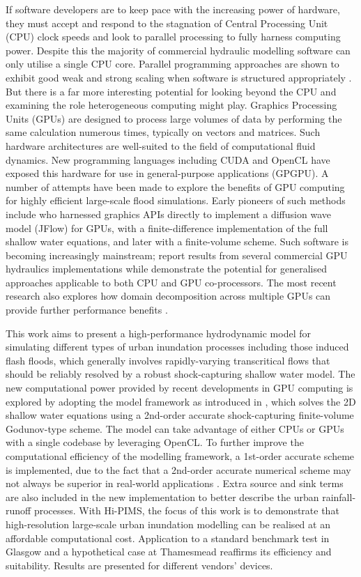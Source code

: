 \documentclass[11pt,english,a4paper]{article}
\begin{document}
If software developers are to keep pace with the increasing power of hardware, they must accept and respond to the stagnation of Central Processing Unit (CPU) clock speeds and look to parallel processing to fully harness computing power. Despite this the majority of commercial hydraulic modelling software can only utilise a single CPU core. Parallel programming approaches are shown to exhibit good weak and strong scaling when software is structured appropriately \citep[e.g.][]{Neal2010,Saetra2012}. But there is a far more interesting potential for looking beyond the CPU and examining the role heterogeneous computing might play. Graphics Processing Units (GPUs) are designed to process large volumes of data by performing the same calculation numerous times, typically on vectors and matrices. Such hardware architectures are well-suited to the field of computational fluid dynamics. New programming languages including CUDA and OpenCL have exposed this hardware for use in general-purpose applications (GPGPU). A number of attempts have been made to explore the benefits of GPU computing for highly efficient large-scale flood simulations. Early pioneers of such methods include \citet{Crossley2009} who harnessed graphics APIs directly to implement a diffusion wave model (JFlow) for GPUs, \citet{Kalyanapu2011} with a finite-difference implementation of the full shallow water equations, and later \citet{Brodtkorb2012} with a finite-volume scheme. Such software is becoming increasingly mainstream; \citet{Pender2013} report results from several commercial GPU hydraulics implementations while \citet{Smith2013} demonstrate the potential for generalised approaches applicable to both CPU and GPU co-processors. The most recent research also explores how domain decomposition across multiple GPUs can provide further performance benefits \citep{Saetra2012}. 

This work aims to present a high-performance hydrodynamic model for simulating different types of urban inundation processes including those induced flash floods, which generally involves rapidly-varying transcritical flows that should be reliably resolved by a robust shock-capturing shallow water model. The new computational power provided by recent developments in GPU computing is explored by adopting the model framework as introduced in \citet{Smith2013}, which solves the 2D shallow water equations using a 2nd-order accurate shock-capturing finite-volume Godunov-type scheme. The model can take advantage of either CPUs or GPUs with a single codebase by leveraging OpenCL. To further improve the computational efficiency of the modelling framework, a 1st-order accurate scheme is implemented, due to the fact that a 2nd-order accurate numerical scheme may not always be superior in real-world applications \citep{Zhang2013}. Extra source and sink terms are also included in the new implementation to better describe the urban rainfall-runoff processes. With Hi-PIMS, the focus of this work is to demonstrate that high-resolution large-scale urban inundation modelling can be realised at an affordable computational cost. Application to a standard benchmark test in Glasgow and a hypothetical case at Thamesmead reaffirms its efficiency and suitability. Results are presented for different vendors' devices.
\end{document}
